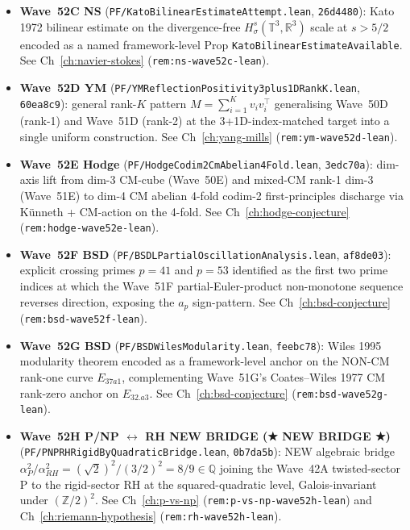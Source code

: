 \begin{remark}
\begin{itemize}
  \item \textbf{Wave~52C NS} (\texttt{PF/KatoBilinearEstimateAttempt.lean}, \texttt{26d4480}): Kato 1972 bilinear estimate on the divergence-free $H^s_\sigma(\mathbb{T}^3, \mathbb{R}^3)$ scale at $s > 5/2$ encoded as a named framework-level Prop \texttt{KatoBilinearEstimateAvailable}. See Ch~\ref{ch:navier-stokes} (\texttt{rem:ns-wave52c-lean}).
  \item \textbf{Wave~52D YM} (\texttt{PF/YMReflectionPositivity3plus1DRankK.lean}, \texttt{60ea8c9}): general rank-$K$ pattern $M = \sum_{i=1}^K v_i v_i^\top$ generalising Wave~50D (rank-1) and Wave~51D (rank-2) at the 3+1D-index-matched target into a single uniform construction. See Ch~\ref{ch:yang-mills} (\texttt{rem:ym-wave52d-lean}).
  \item \textbf{Wave~52E Hodge} (\texttt{PF/HodgeCodim2CmAbelian4Fold.lean}, \texttt{3edc70a}): dim-axis lift from dim-3 CM-cube (Wave~50E) and mixed-CM rank-1 dim-3 (Wave~51E) to dim-4 CM abelian 4-fold codim-2 first-principles discharge via K\"unneth + CM-action on the 4-fold. See Ch~\ref{ch:hodge-conjecture} (\texttt{rem:hodge-wave52e-lean}).
  \item \textbf{Wave~52F BSD} (\texttt{PF/BSDLPartialOscillationAnalysis.lean}, \texttt{af8de03}): explicit crossing primes $p = 41$ and $p = 53$ identified as the first two prime indices at which the Wave~51F partial-Euler-product non-monotone sequence reverses direction, exposing the $a_p$ sign-pattern. See Ch~\ref{ch:bsd-conjecture} (\texttt{rem:bsd-wave52f-lean}).
  \item \textbf{Wave~52G BSD} (\texttt{PF/BSDWilesModularity.lean}, \texttt{feebc78}): Wiles 1995 modularity theorem encoded as a framework-level anchor on the NON-CM rank-one curve $E_{37a1}$, complementing Wave~51G's Coates--Wiles 1977 CM rank-zero anchor on $E_{32.a3}$. See Ch~\ref{ch:bsd-conjecture} (\texttt{rem:bsd-wave52g-lean}).
  \item \textbf{Wave~52H P/NP $\leftrightarrow$ RH NEW BRIDGE (★ NEW BRIDGE ★)} (\texttt{PF/PNPRHRigidByQuadraticBridge.lean}, \texttt{0b7da5b}): NEW algebraic bridge $\alpha_P^2 / \alpha_{RH}^2 = (\sqrt{2})^2 / (3/2)^2 = 8/9 \in \mathbb{Q}$ joining the Wave~42A twisted-sector P to the rigid-sector RH at the squared-quadratic level, Galois-invariant under $(\mathbb{Z}/2)^2$. See Ch~\ref{ch:p-vs-np} (\texttt{rem:p-vs-np-wave52h-lean}) and Ch~\ref{ch:riemann-hypothesis} (\texttt{rem:rh-wave52h-lean}).
\end{itemize}

\end{remark}
